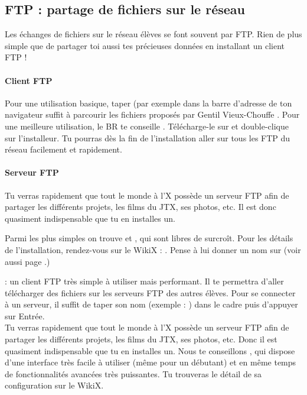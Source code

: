 \subsection{FTP : partage de fichiers sur le r\'eseau}

Les \'echanges de fichiers sur le r\'eseau \'el\`eves se font souvent par FTP. Rien de plus simple que de partager toi aussi tes pr\'ecieuses donn\'ees en installant un client FTP !

\paragraph{Client FTP}
Pour une utilisation basique, taper   (par exemple  dans la barre d'adresse de ton navigateur suffit \`a parcourir les fichiers propos\'es par \og Gentil Vieux-Chouffe \fg.
Pour une meilleure utilisation, le BR te conseille . T\'el\'echarge-le sur  et double-clique sur l'installeur.
Tu pourras d\`es la fin de l'installation aller sur tous les FTP du r\'eseau
facilement et rapidement.

\paragraph{Serveur FTP}
Tu verras rapidement que tout le monde \`a  l'X poss\`ede un serveur FTP
afin de partager les diff\'erents projets, les films du JTX, ses
photos, etc. Il est donc quasiment indispensable que tu en installes
un.

Parmi les plus simples on trouve  et , qui sont libres de surcro\^{i}t. Pour les d\'etails de l'installation, rendez-vous sur le WikiX : .
Pense \`a lui donner un nom sur  (voir aussi page \pageref{dnsapp}.)

  : un client FTP tr\`es simple \`a  utiliser mais performant. Il te permettra d'aller t\'el\'echarger des fichiers sur les serveurs FTP des autres \'el\`eves.
Pour se connecter \`a  un serveur, il suffit de taper son nom (exemple : ) dans le cadre  puis d'appuyer sur Entr\'ee.\\
Tu verras rapidement que tout le monde \`a  l'X poss\`ede un serveur FTP afin de partager les diff\'erents projets, les films du JTX, ses photos, etc. Donc il est quasiment indispensable que tu en installes un. Nous te conseillons , qui dispose d'une interface tr\`es facile \`a  utiliser (m\^eme pour un d\'ebutant) et en m\^eme temps de fonctionnalit\'es avanc\'ees tr\`es puissantes. Tu trouveras le d\'etail de sa configuration sur le WikiX.


